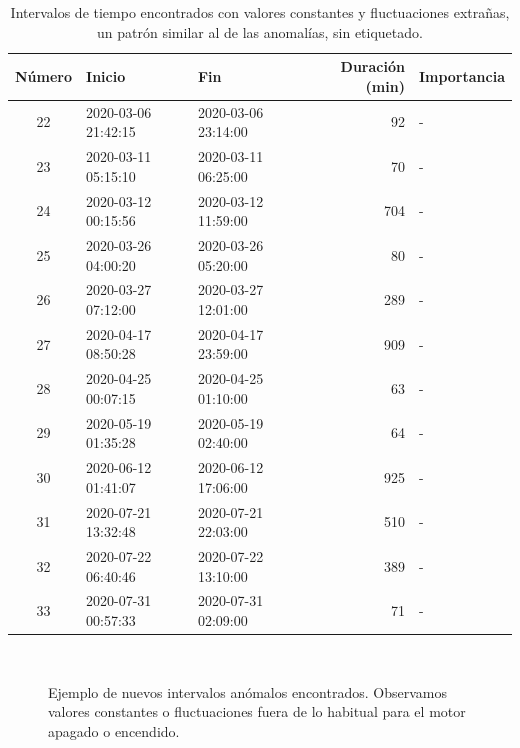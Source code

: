 \documentclass[12pt,letterpaper]{article}
\begin{document}
\begin{table}[htp]
    \centering
    \begin{tabular}{cllrl}
    \hline
    \textbf{Número} & \textbf{Inicio}       & \textbf{Fin}         & \textbf{Duración (min)} & \textbf{Importancia} \\ \hline
    22 & 2020-03-06 21:42:15 & 2020-03-06 23:14:00 & 92 & - \\ 
    23 & 2020-03-11 05:15:10 & 2020-03-11 06:25:00 & 70 & - \\ 
    24 & 2020-03-12 00:15:56 & 2020-03-12 11:59:00 & 704 & - \\
    25 & 2020-03-26 04:00:20 & 2020-03-26 05:20:00 & 80 & - \\ 
    26 & 2020-03-27 07:12:00 & 2020-03-27 12:01:00 & 289 & - \\
    27 & 2020-04-17 08:50:28 & 2020-04-17 23:59:00 & 909 & - \\
    28 & 2020-04-25 00:07:15 & 2020-04-25 01:10:00 & 63 & - \\ 
    29 & 2020-05-19 01:35:28 & 2020-05-19 02:40:00 & 64 & - \\ 
    30 & 2020-06-12 01:41:07 & 2020-06-12 17:06:00 & 925 & - \\
    31 & 2020-07-21 13:32:48 & 2020-07-21 22:03:00 & 510 & - \\
    32 & 2020-07-22 06:40:46 & 2020-07-22 13:10:00 & 389 & - \\
    33 & 2020-07-31 00:57:33 & 2020-07-31 02:09:00 & 71 & - \\ \hline
    \end{tabular}
    \caption{Intervalos de tiempo encontrados con valores constantes y fluctuaciones extrañas, un patrón similar al de las anomalías, sin etiquetado.}
    \label{tab:EventosRaros}
\end{table}

\begin{figure}[htp]
        \centering
        \\
        \caption{Ejemplo de nuevos intervalos anómalos encontrados. Observamos valores constantes o fluctuaciones fuera de lo habitual para el motor apagado o encendido.}
        \label{fig:EventosRaros}
\end{figure}
\end{document}
